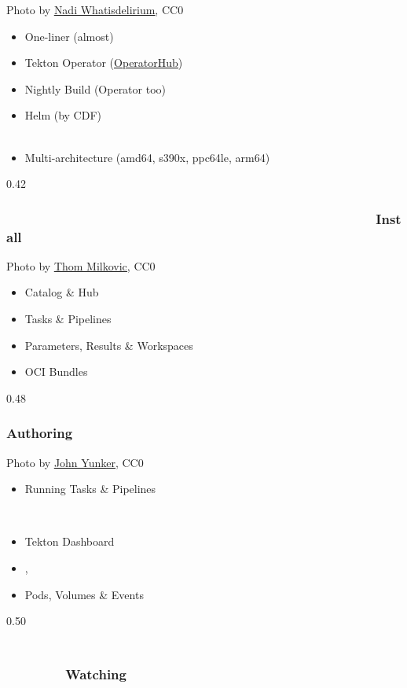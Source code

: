 \documentclass[aspectratio=169,11pt,hyperref={colorlinks=true}]{beamer}
\begin{document}
\begin{lpicrblack}{%
  Photo by \href{https://unsplash.com/@whatisdelirium}{\underline{Nadi Whatisdelirium}}, CC0
  }%
  {%
  \begin{itemize}
    \item One-liner (almost)
    \item Tekton Operator (\href{https://operatorhub.io/operator/tektoncd-operator}{\underline{OperatorHub}})
    \item Nightly Build (Operator too)
    \item Helm (by CDF)\\~
    \item Multi-architecture (amd64, s390x, ppc64le, arm64)
  \end{itemize}
  }%
  {0.42}%
  \frametitle{~~~~~~~~~~~~~~~~~~~~~~~~~~~~~~~~~~~~~~~~~~~~~~~~~~Install}
\end{lpicrblack}

\begin{lgrayframerpic}{%
  Photo by \href{https://unsplash.com/@thommilkovic}{\underline{Thom Milkovic}}, CC0
  }%
  {%
  \begin{itemize}
    \item Catalog \& Hub
    \item Tasks \& Pipelines
    \item Parameters, Results \& Workspaces
    \item OCI Bundles
  \end{itemize}
  }%
  {0.48}
  \frametitle{Authoring}
\end{lgrayframerpic}

\begin{lpicrblack}{%
  Photo by \href{https://unsplash.com/@jyunker}{\underline{John Yunker}}, CC0
  }%
  {%
  \begin{itemize}
    \item Running Tasks \& Pipelines
  \end{itemize}
  ~\\
  \begin{itemize}
    \item Tekton Dashboard
    \item {}, 
    \item Pods, Volumes \& Events
  \end{itemize}
  }%
  {0.50}%
  \frametitle{~~~~~~~~~~~~~~~~~~~~~~~~~~~~~~~~~~~~~~~~~~~~~~~~~~~~~~~~~~~~~Watching}
\end{lpicrblack}
\end{document}
